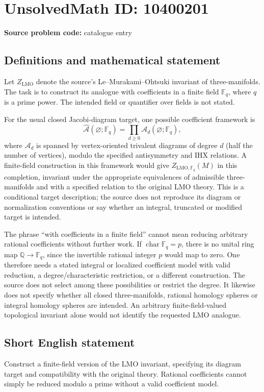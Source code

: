 \documentclass[11pt]{article}
\newcommand{\Q}{\mathbb{Q}}
\newcommand{\F}{\mathbb{F}}
\begin{document}
\section*{UnsolvedMath ID: 10400201}
\textbf{Source problem code:} catalogue entry
\subsection{Definitions and mathematical statement}
Let \(Z_{\mathrm{LMO}}\) denote the source's Le--Murakami--Ohtsuki invariant of three-manifolds. The task is to construct its analogue with coefficients in a finite field \(\F_q\), where \(q\) is a prime power. The intended field or quantifier over fields is not stated.

For the usual closed Jacobi-diagram target, one possible coefficient framework is
\[\widehat{\mathcal A}(\varnothing;\F_q)=\prod_{d\geq0}\mathcal A_d(\varnothing;\F_q),\]
where \(\mathcal A_d\) is spanned by vertex-oriented trivalent diagrams of degree \(d\) (half the number of vertices), modulo the specified antisymmetry and IHX relations. A finite-field construction in this framework would give \(Z_{\mathrm{LMO},\F_q}(M)\) in this completion, invariant under the appropriate equivalences of admissible three-manifolds and with a specified relation to the original LMO theory. This is a conditional target description; the source does not reproduce its diagram or normalization conventions or say whether an integral, truncated or modified target is intended.

The phrase ``with coefficients in a finite field'' cannot mean reducing arbitrary rational coefficients without further work. If \(\operatorname{char}\F_q=p\), there is no unital ring map \(\Q\to\F_q\), since the invertible rational integer \(p\) would map to zero. One therefore needs a stated integral or localized coefficient model with valid reduction, a degree/characteristic restriction, or a different construction. The source does not select among these possibilities or restrict the degree. It likewise does not specify whether all closed three-manifolds, rational homology spheres or integral homology spheres are intended. An arbitrary finite-field-valued topological invariant alone would not identify the requested LMO analogue.
\subsection{Short English statement}
Construct a finite-field version of the LMO invariant, specifying its diagram target and compatibility with the original theory. Rational coefficients cannot simply be reduced modulo a prime without a valid coefficient model.
\end{document}
